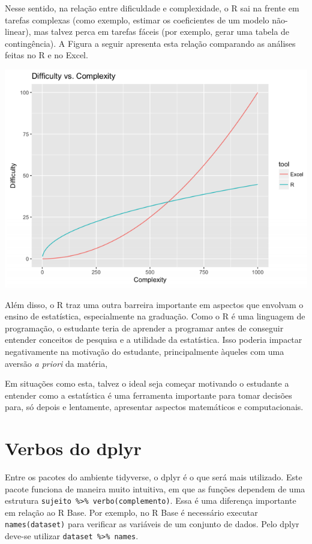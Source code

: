 \documentclass[
]{book}
\begin{document}
Nesse sentido, na relação entre dificuldade e complexidade, o R sai na frente em tarefas complexas (como exemplo, estimar os coeficientes de um modelo não-linear), mas talvez perca em tarefas fáceis (por exemplo, gerar uma tabela de contingência). A Figura a seguir apresenta esta relação comparando as análises feitas no R e no Excel.

\includegraphics{./img/excel_r.PNG}

Além disso, o R traz uma outra barreira importante em aspectos que envolvam o ensino de estatística, especialmente na graduação. Como o R é uma linguagem de programação, o estudante teria de aprender a programar antes de conseguir entender conceitos de pesquisa e a utilidade da estatística. Isso poderia impactar negativamente na motivação do estudante, principalmente àqueles com uma aversão \emph{a priori} da matéria,

Em situações como esta, talvez o ideal seja começar motivando o estudante a entender como a estatística é uma ferramenta importante para tomar decisões para, só depois e lentamente, apresentar aspectos matemáticos e computacionais.

\hypertarget{verbos-do-dplyr}{%
\section{Verbos do dplyr}\label{verbos-do-dplyr}}

Entre os pacotes do ambiente tidyverse, o dplyr é o que será mais utilizado. Este pacote funciona de maneira muito intuitiva, em que as funções dependem de uma estrutura \texttt{sujeito\ \%\textgreater{}\%\ verbo(complemento)}. Essa é uma diferença importante em relação ao R Base. Por exemplo, no R Base é necessário executar \texttt{names(dataset)} para verificar as variáveis de um conjunto de dados. Pelo dplyr deve-se utilizar \texttt{dataset\ \%\textgreater{}\%\ names}.
\end{document}
